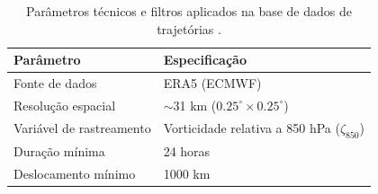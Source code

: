 \begin{table}[ht]
\centering
\caption[Parâmetros e filtros da base de trajetórias]{Parâmetros técnicos e filtros aplicados na base de dados de trajetórias \citep{gramcianinov2020analysis}.}
\label{tab:tracking_params}
\begin{tabular*}{\textwidth}{@{\extracolsep{\fill}}ll}
\hline
Parâmetro & Especificação \\
\hline
Fonte de dados & ERA5 (ECMWF) \\
Resolução espacial & $\sim$31 km ($0.25^\circ \times 0.25^\circ$) \\
Variável de rastreamento & Vorticidade relativa a 850 hPa ($\zeta_{850}$) \\
Duração mínima & 24 horas \\
Deslocamento mínimo & 1000 km \\
\hline
\end{tabular*}
\end{table}
